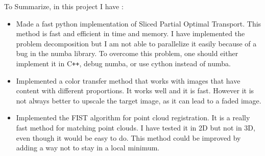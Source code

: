 \documentclass[a4paper,12pt]{article}
\begin{document}
\bigskip


To Summarize, in this project I have :
\begin{itemize}
\item Made a fast python implementation of Sliced Partial Optimal Transport. This method is fast and efficient in time and memory. I have implemented the problem decomposition but I am not able to parallelize it easily because of a bug in the numba library. To overcome this problem, one should either implement it in C\texttt{++}, debug numba, or use cython instead of numba.
\item Implemented a color transfer method that works with images that have content with different proportions. It works well and it is fast. However it is not always better to upscale the target image, as it can lead to a faded image.
\item Implemented the FIST algorithm for point cloud registration. It is a really fast method for matching point clouds. I have tested it in 2D but not in 3D, even though it would be easy to do. This method could be improved by adding a way not to stay in a local minimum.
\end{itemize}






\end{document}
